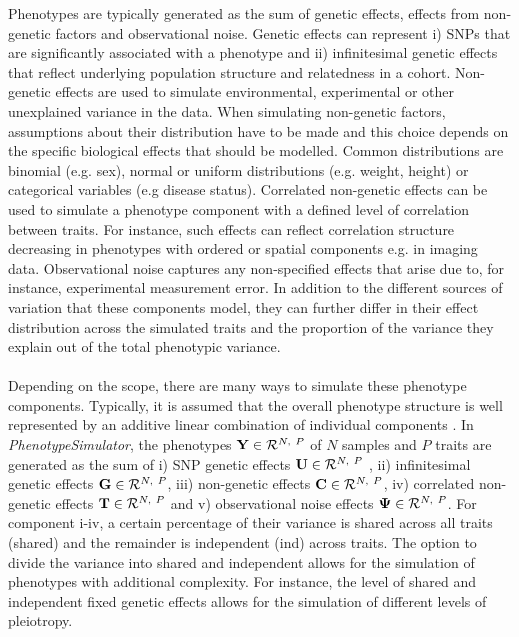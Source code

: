 Phenotypes are typically generated as the sum of genetic effects, effects from non-genetic factors and observational noise. Genetic effects can represent i) SNPs that are significantly associated with a phenotype and ii) infinitesimal genetic effects that reflect underlying population structure and relatedness in a cohort. Non-genetic effects are used to simulate environmental, experimental or other unexplained variance in the data. When simulating non-genetic factors, assumptions about their distribution have to be made and this choice depends on the specific biological effects that should be modelled. Common distributions are binomial (e.g. sex), normal or uniform distributions (e.g. weight, height) or categorical variables (e.g disease status).  Correlated non-genetic effects can be used to simulate a phenotype component with a defined level of correlation between traits. For instance, such effects can reflect correlation structure decreasing in phenotypes with ordered or spatial components e.g. in imaging data. Observational noise captures any non-specified effects that arise due to, for instance, experimental measurement error. In addition to the different sources of variation that these components model, they can further differ in their effect distribution across the simulated traits and the proportion of the variance they explain out of the total phenotypic variance. 
\\
\\
Depending on the scope, there are many ways to simulate these phenotype components. Typically, it is assumed that the overall phenotype structure is well represented by an additive linear combination of individual components \citep{Stephens2013,Marigorta2014,Zhou2014,Loh2014}. In \textit{PhenotypeSimulator}, the phenotypes \( \boldsymbol{\mathbf{Y}} \in \mathcal{R}^{N,~P}\) of \(N\) samples and \(P\) traits are generated as the sum of i) SNP genetic effects \( \boldsymbol{\mathbf{U}}  \in \mathcal{R}^{N,~P}\) , ii) infinitesimal genetic effects \( \boldsymbol{\mathbf{G}} \in \mathcal{R}^{N,~P}\), iii) non-genetic effects \( \boldsymbol{\mathbf{C}} \in \mathcal{R}^{N,~P}\),  iv) correlated non-genetic effects \( \boldsymbol{\mathbf{T}} \in \mathcal{R}^{N,~P}\) and  v) observational noise effects \( \boldsymbol{\mathbf{\Psi}} \in \mathcal{R}^{N,~P}\). For component i-iv, a certain percentage of their variance is shared across all traits (shared) and the remainder is independent (ind) across traits. The option to divide the variance into shared and independent allows for the simulation of phenotypes with additional complexity. For instance, the level of shared and independent fixed genetic effects allows for the simulation of different levels of pleiotropy.
